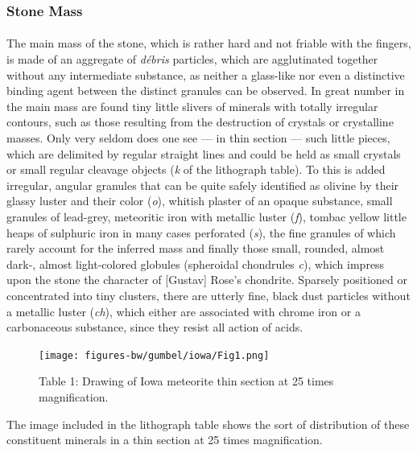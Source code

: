 \documentclass[a4paper, 12pt, oneside]{article}
\begin{document}
\subsubsection{Stone Mass}
\paragraph*{}
The main mass of the stone, which is rather hard and not friable with the fingers, is made of an aggregate of \emph{débris} particles, which are agglutinated together without any intermediate substance, as neither a glass-like nor even a distinctive binding agent between the distinct granules can be observed. In great number in the main mass are found tiny little slivers of minerals with totally irregular contours, such as those resulting from the destruction of crystals or crystalline masses. Only very seldom does one see --- in thin section --- such little pieces, which are delimited by regular straight lines and could be held as small crystals or small regular cleavage objects (\emph{k} of the lithograph table). To this is added irregular, angular granules that can be quite safely identified as olivine by their glassy luster and their color (\emph{o}), whitish plaster of an opaque substance, small granules of lead-grey, meteoritic iron with metallic luster (\emph{f}), tombac yellow little heaps of sulphuric iron in many cases perforated (\emph{s}), the fine granules of which rarely account for the inferred mass and finally those small, rounded, almost dark-, almost light-colored globules (spheroidal chondrules \emph{c}), which impress upon the stone the character of [Gustav] Rose's chondrite. Sparsely positioned or concentrated into tiny clusters, there are utterly fine, black dust particles without a metallic luster (\emph{ch}), which either are associated with chrome iron or a carbonaceous substance, since they resist all action of acids.
\clearpage
\begin{figure}[t]
\centering
\texttt{[image: figures-bw/gumbel/iowa/Fig1.png]}
\caption{Table 1: Drawing of Iowa meteorite thin section at 25 times magnification.}
\end{figure}
The image included in the lithograph table shows the sort of distribution of these constituent minerals in a thin section at 25 times magnification.
\end{document}
